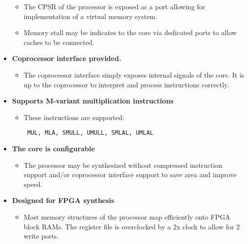 \documentclass[11pt]{article}
\begin{document}
\begin{itemize}
\begin{itemize}
        \item The CPSR of the processor is exposed as a port allowing for 
        implementation of a virtual memory system. 

        \item Memory stall may be indicates to the core via dedicated ports to 
        allow caches to be connected.

        \end{itemize}

\item \textbf{Coprocessor interface provided.}

        \begin{itemize}

        \item The coprocessor interface simply exposes internal signals of the 
        core. It is up to the coprocessor to interpret and process instructions 
        correctly.

        \end{itemize}

\item \textbf{Supports M-variant multiplication instructions}

        \begin{itemize}

        \item These instructions are supported: 

        \texttt
        {
                MUL, MLA, 
                SMULL, UMULL,
                SMLAL, UMLAL
        }

        \end{itemize}

\item \textbf{The core is configurable}

\begin{itemize}

        \item The processor may be synthesized without compressed instruction 
        support and/or coprocessor interface support to save area and improve
        speed.

\end{itemize}

\item \textbf{Designed for FPGA synthesis}

        \begin{itemize}

        \item Most memory structures of the processor map efficiently onto FPGA 
        block RAMs. The register file is overclocked by a 2x clock to allow for 
        2 write ports.


\end{itemize}
\end{itemize}
\end{document}
